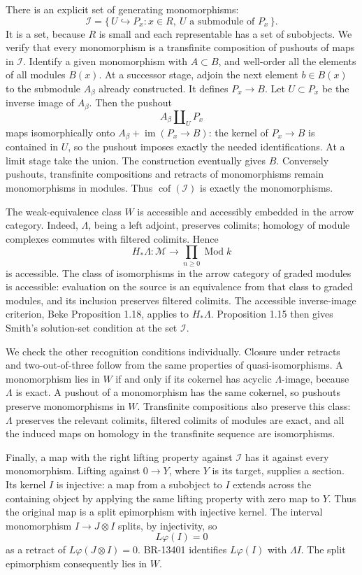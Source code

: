 \documentclass[11pt,a4paper]{article}
\theoremstyle{definition}\newtheorem{definition}[theorem]{Definition}
\theoremstyle{remark}\newtheorem{remark}[theorem]{Remark}
\begin{document}
There is an explicit set of generating monomorphisms:
\[
 \mathcal I=\{\,U\hookrightarrow P_x:
       x\in R,\ U\text{ a submodule of }P_x\,\}.
 \tag{SM29.4}
\]
It is a set, because \(R\) is small and each representable has a
set of subobjects.  We verify that every monomorphism is a
transfinite composition of pushouts of maps in \(\mathcal I\).
Identify a given monomorphism with \(A\subset B\), and well-order
all the elements of all modules \(B(x)\).  At a successor stage,
adjoin the next element \(b\in B(x)\) to the submodule \(A_\beta\)
already constructed.  It defines \(P_x\to B\).  Let
\(U\subset P_x\) be the inverse image of \(A_\beta\).
Then the pushout
\[
 A_\beta\amalg_U P_x
\]
maps isomorphically onto \(A_\beta+\operatorname{im}(P_x\to B)\):
the kernel of \(P_x\to B\) is contained in \(U\), so the pushout
imposes exactly the needed identifications.  At a limit stage
take the union.  The construction eventually gives \(B\).
Conversely pushouts, transfinite compositions and retracts of
monomorphisms remain monomorphisms in modules.  Thus
\(\operatorname{cof}(\mathcal I)\) is exactly the monomorphisms.

The weak-equivalence class \(W\) is accessible and accessibly
embedded in the arrow category.  Indeed, \(\Lambda\), being a
left adjoint, preserves colimits; homology of module complexes
commutes with filtered colimits.  Hence
\[
 H_*\Lambda:\mathcal M\longrightarrow
       \prod_{n\ge0}\operatorname{Mod}k
\]
is accessible.  The class of isomorphisms in the arrow category
of graded modules is accessible: evaluation on the source is an
equivalence from that class to graded modules, and its inclusion
preserves filtered colimits.  The accessible inverse-image
criterion, Beke Proposition 1.18, applies to \(H_*\Lambda\).
Proposition 1.15 then gives Smith's solution-set condition at
the set \(\mathcal I\).

We check the other recognition conditions individually.
Closure under retracts and two-out-of-three follow from the
same properties of quasi-isomorphisms.
A monomorphism lies in \(W\) if and only if its cokernel has
acyclic \(\Lambda\)-image, because \(\Lambda\) is exact.
A pushout of a monomorphism has the same cokernel, so pushouts
preserve monomorphisms in \(W\).
Transfinite compositions also preserve this class: \(\Lambda\)
preserves the relevant colimits, filtered colimits of modules
are exact, and all the induced maps on homology in the
transfinite sequence are isomorphisms.

Finally, a map with the right lifting property against
\(\mathcal I\) has it against every monomorphism.
Lifting against \(0\to Y\), where \(Y\) is its target, supplies
a section.  Its kernel \(I\) is injective: a map from a subobject
to \(I\) extends across the containing object by applying the
same lifting property with zero map to \(Y\).
Thus the original map is a split epimorphism with injective
kernel.  The interval monomorphism
\(I\to J\otimes I\) splits, by injectivity, so
\[
 L\varphi(I)=0
\]
as a retract of \(L\varphi(J\otimes I)=0\).
BR-13401 identifies \(L\varphi(I)\) with \(\Lambda I\).
The split epimorphism consequently lies in \(W\).
\end{document}
